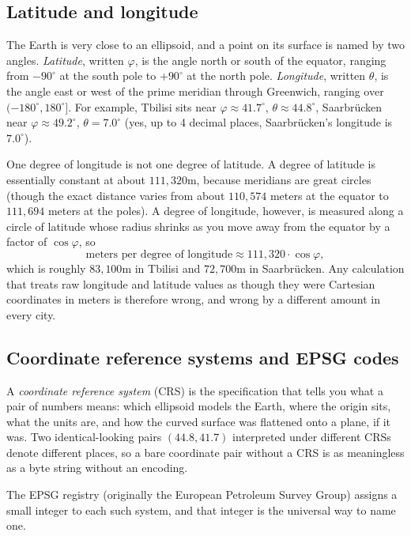 \documentclass[11pt,a4paper]{article}
\theoremstyle{plain}
\theoremstyle{definition}
\theoremstyle{remark}
\begin{document}
\subsection{Latitude and longitude}

The Earth is very close to an ellipsoid, and a point on its surface is named by two angles. \emph{Latitude}, written $\varphi$, is the angle north or south of the equator, ranging from $-90^\circ$ at the south pole to $+90^\circ$ at the north pole. \emph{Longitude}, written $\theta$, is the angle east or west of the prime meridian through Greenwich, ranging over $(-180^\circ, 180^\circ]$. For example, Tbilisi sits near $\varphi \approx 41.7^\circ$, $\theta \approx 44.8^\circ$, Saarbr\"ucken near $\varphi \approx 49.2^\circ$, $\theta = 7.0^\circ$ (yes, up to 4 decimal places, Saarbr\"ucken's longitude is $7.0^\circ$).

One degree of longitude is not one degree of latitude. A degree of latitude is essentially constant at about $111,320$m, because meridians are great circles (though the exact distance varies from about $110,574$ meters at the equator to $111,694$ meters at the poles). A degree of longitude, however, is measured along a circle of latitude whose radius shrinks as you move away from the equator by a factor of $\cos\varphi$, so
$$\text{meters per degree of longitude} \approx 111{,}320 \cdot \cos\varphi,$$
which is roughly $83,100$m in Tbilisi and $72,700$m in Saarbr\"ucken. Any calculation that treats raw longitude and latitude values as though they were Cartesian coordinates in meters is therefore wrong, and wrong by a different amount in every city.

\subsection{Coordinate reference systems and EPSG codes}

A \emph{coordinate reference system} (CRS) is the specification that tells you what a pair of numbers means: which ellipsoid models the Earth, where the origin sits, what the units are, and how the curved surface was flattened onto a plane, if it was. Two identical-looking pairs $(44.8, 41.7)$ interpreted under different CRSs denote different places, so a bare coordinate pair without a CRS is as meaningless as a byte string without an encoding.

The EPSG registry (originally the European Petroleum Survey Group) assigns a small integer to each such system, and that integer is the universal way to name one.
\end{document}
